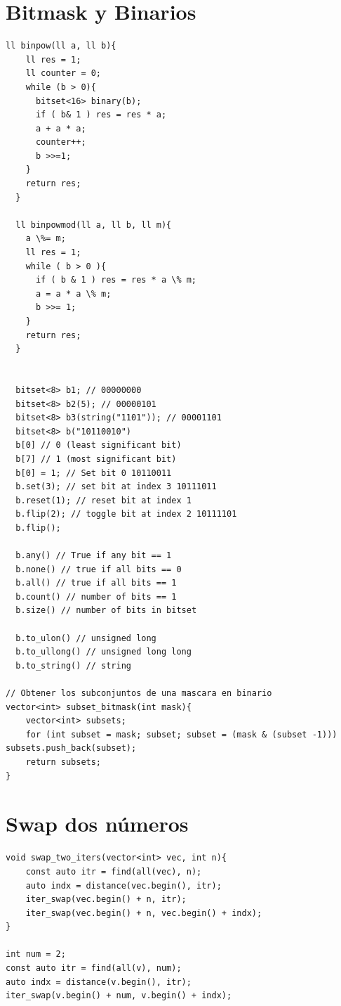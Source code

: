\documentclass{article}
\begin{document}
\section{Bitmask y Binarios}

\begin{lstlisting}[style=cppstyle]
  ll binpow(ll a, ll b){
    ll res = 1;
    ll counter = 0;
    while (b > 0){
      bitset<16> binary(b);
      if ( b& 1 ) res = res * a;
      a + a * a;
      counter++;
      b >>=1;
    }
    return res;
  }

  ll binpowmod(ll a, ll b, ll m){
    a \%= m;
    ll res = 1;
    while ( b > 0 ){
      if ( b & 1 ) res = res * a \% m;
      a = a * a \% m;
      b >>= 1;
    }
    return res;
  }


  bitset<8> b1; // 00000000
  bitset<8> b2(5); // 00000101
  bitset<8> b3(string("1101")); // 00001101
  bitset<8> b("10110010")
  b[0] // 0 (least significant bit)
  b[7] // 1 (most significant bit)
  b[0] = 1; // Set bit 0 10110011
  b.set(3); // set bit at index 3 10111011
  b.reset(1); // reset bit at index 1
  b.flip(2); // toggle bit at index 2 10111101
  b.flip();

  b.any() // True if any bit == 1
  b.none() // true if all bits == 0
  b.all() // true if all bits == 1
  b.count() // number of bits == 1
  b.size() // number of bits in bitset

  b.to_ulon() // unsigned long
  b.to_ullong() // unsigned long long
  b.to_string() // string

// Obtener los subconjuntos de una mascara en binario
vector<int> subset_bitmask(int mask){
    vector<int> subsets;
    for (int subset = mask; subset; subset = (mask & (subset -1))) subsets.push_back(subset);
    return subsets;
}
\end{lstlisting}

\section{Swap dos números}


\begin{lstlisting}[style=cppstyle]
void swap_two_iters(vector<int> vec, int n){
    const auto itr = find(all(vec), n);
    auto indx = distance(vec.begin(), itr);
    iter_swap(vec.begin() + n, itr);
    iter_swap(vec.begin() + n, vec.begin() + indx);
}

int num = 2;
const auto itr = find(all(v), num);
auto indx = distance(v.begin(), itr);
iter_swap(v.begin() + num, v.begin() + indx);
\end{lstlisting}
\end{document}
